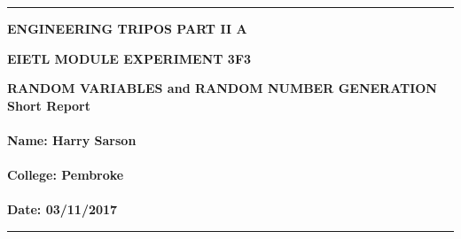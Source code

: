 \documentclass[12pt]{article}
\begin{document}
\noindent
\rule{15.7cm}{0.5mm}


\begin{center}
{\bf ENGINEERING TRIPOS PART II A}
\end{center}
\vspace{0.5cm} {\bf EIETL \hfill MODULE EXPERIMENT 3F3}
\vspace{0.5cm}
\begin{center}
{\bf RANDOM VARIABLES and RANDOM NUMBER GENERATION\\
Short  Report \\\hfill \\Name: Harry Sarson \\\hfill\\
College: Pembroke \\\hfill
\\
Date: 03/11/2017
}
\end{center}
\rule{15.7cm}{0.5mm}



\vspace*{1cm}
\vspace*{1cm}
\end{document}
